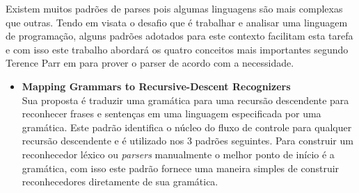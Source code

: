 Existem muitos padr\~{o}es de parses pois algumas linguagens s\~{a}o mais complexas que outras. Tendo em visata o desafio que \'{e} trabalhar e analisar uma linguagem de programa\c{c}\~{a}o, alguns padr\~{o}es adotados para este contexto facilitam esta tarefa e com isso este trabalho abordar\'{a} os quatro conceitos  mais importantes segundo Terence Parr em \cite{Parr:2009:LIP:1823613} para prover o parser de acordo com a necessidade.
\begin{itemize}
	\item \textbf{Mapping Grammars to Recursive-Descent Recognizers}\\
	Sua proposta \'{e} traduzir uma gram\'{a}tica para uma recurs\~{a}o descendente para reconhecer frases e sentenças em uma linguagem especificada por uma gram\'{a}tica. Este padr\~{a}o identifica o n\'{u}cleo do fluxo de controle para qualquer recurs\~{a}o descendente e \'{e} utilizado nos 3 padr\~{o}es seguintes. 
	Para construir um reconhecedor l\'{e}xico ou \textit{parsers} manualmente o melhor ponto de in\'{i}cio \'{e} a gram\'{a}tica, com isso este padr\~{a}o fornece uma maneira simples de construir reconhecedores diretamente de sua gram\'{a}tica.
	

\end{itemize}
